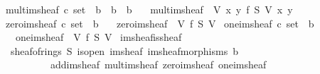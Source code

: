\documentclass[12pt]{scrartcl}
\begin{document}
\begin{isabelle}
\isanewline
{}\isamarkupfalse%
\ mult{\isacharunderscore}{\kern0pt}im{\isacharunderscore}{\kern0pt}sheaf{\isacharcolon}{\kern0pt}{\isacharcolon}{\kern0pt}\ {\isachardoublequoteopen}{\isacharprime}{\kern0pt}c\ set\ {\isasymRightarrow}\ {\isacharprime}{\kern0pt}b\ {\isasymRightarrow}\ {\isacharprime}{\kern0pt}b\ {\isasymRightarrow}\ {\isacharprime}{\kern0pt}b{\isachardoublequoteclose}\isanewline
\ \ \ {\isachardoublequoteopen}mult{\isacharunderscore}{\kern0pt}im{\isacharunderscore}{\kern0pt}sheaf\ {\isasymequiv}\ {\isasymlambda}V\ x\ y{\isachardot}{\kern0pt}\ {\isasymcdot}\isactrlbsub {\isacharparenleft}{\kern0pt}f\isactrlsup {\isasyminverse}\ S\ V{\isacharparenright}{\kern0pt}\isactrlesub \ x\ y{\isachardoublequoteclose}\isanewline
\isanewline
{}\isamarkupfalse%
\ zero{\isacharunderscore}{\kern0pt}im{\isacharunderscore}{\kern0pt}sheaf{\isacharcolon}{\kern0pt}{\isacharcolon}{\kern0pt}\ {\isachardoublequoteopen}{\isacharprime}{\kern0pt}c\ set\ {\isasymRightarrow}\ {\isacharprime}{\kern0pt}b{\isachardoublequoteclose}\isanewline
\ \ \ {\isachardoublequoteopen}zero{\isacharunderscore}{\kern0pt}im{\isacharunderscore}{\kern0pt}sheaf\ {\isasymequiv}\ {\isasymlambda}V{\isachardot}{\kern0pt}\ {\isasymzero}\isactrlbsub {\isacharparenleft}{\kern0pt}f\isactrlsup {\isasyminverse}\ S\ V{\isacharparenright}{\kern0pt}\isactrlesub {\isachardoublequoteclose}\isanewline
\isanewline
{}\isamarkupfalse%
\ one{\isacharunderscore}{\kern0pt}im{\isacharunderscore}{\kern0pt}sheaf{\isacharcolon}{\kern0pt}{\isacharcolon}{\kern0pt}\ {\isachardoublequoteopen}{\isacharprime}{\kern0pt}c\ set\ {\isasymRightarrow}\ {\isacharprime}{\kern0pt}b{\isachardoublequoteclose}\isanewline
\ \ \ {\isachardoublequoteopen}one{\isacharunderscore}{\kern0pt}im{\isacharunderscore}{\kern0pt}sheaf\ {\isasymequiv}\ {\isasymlambda}V{\isachardot}{\kern0pt}\ {\isasymone}\isactrlbsub {\isacharparenleft}{\kern0pt}f\isactrlsup {\isasyminverse}\ S\ V{\isacharparenright}{\kern0pt}\isactrlesub {\isachardoublequoteclose}\isanewline
\isanewline
{}\isamarkupfalse%
\ im{\isacharunderscore}{\kern0pt}sheaf{\isacharunderscore}{\kern0pt}is{\isacharunderscore}{\kern0pt}sheaf{\isacharcolon}{\kern0pt}\isanewline
\ \ {\isachardoublequoteopen}sheaf{\isacharunderscore}{\kern0pt}of{\isacharunderscore}{\kern0pt}rings\ S{\isacharprime}{\kern0pt}\ is{\isacharunderscore}{\kern0pt}open{\isacharprime}{\kern0pt}\ im{\isacharunderscore}{\kern0pt}sheaf\ im{\isacharunderscore}{\kern0pt}sheaf{\isacharunderscore}{\kern0pt}morphisms\ b\isanewline
\ \ \ \ \ \ \ \ \ \ add{\isacharunderscore}{\kern0pt}im{\isacharunderscore}{\kern0pt}sheaf\ mult{\isacharunderscore}{\kern0pt}im{\isacharunderscore}{\kern0pt}sheaf\ zero{\isacharunderscore}{\kern0pt}im{\isacharunderscore}{\kern0pt}sheaf\ one{\isacharunderscore}{\kern0pt}im{\isacharunderscore}{\kern0pt}sheaf{\isachardoublequoteclose}\isanewline
{}
\end{isabelle}
\end{document}

